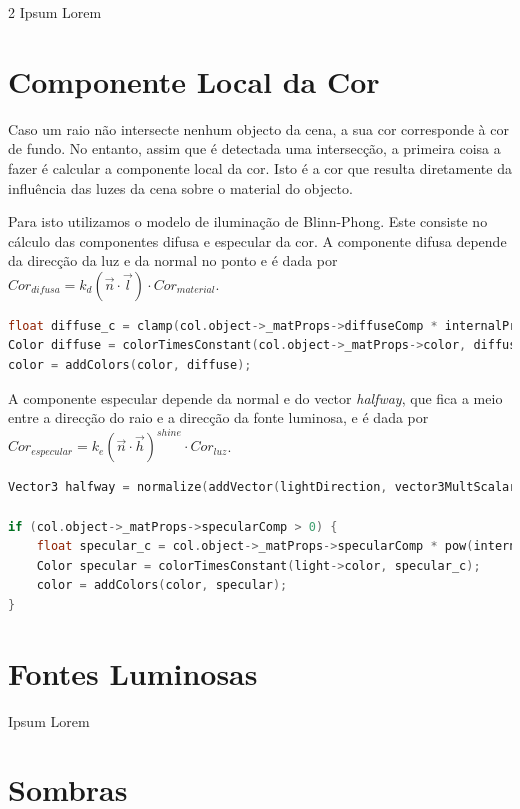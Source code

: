 \documentclass{article}
\begin{document}
\begin{multicols}{2}
    Ipsum Lorem

    \section{Componente Local da Cor}

    Caso um raio não intersecte nenhum objecto da cena, a sua cor corresponde
    à cor de fundo. No entanto, assim que é detectada uma intersecção, a
    primeira coisa a fazer é calcular a componente local da cor. Isto é a cor
    que resulta diretamente da influência das luzes da cena sobre o material
    do objecto.

    Para isto utilizamos o modelo de iluminação de Blinn-Phong. Este consiste no
    cálculo das componentes difusa e especular da cor. A componente difusa depende
    da direcção da luz e da normal no ponto e é dada por
    $ Cor_{difusa} = k_d (\vec{n} \cdot \vec{l}) \cdot Cor_{material} $.

\begin{lstlisting}[language=C++]
float diffuse_c = clamp(col.object->_matProps->diffuseComp * internalProduct(col.normal, lightDirection), 0, 1);
Color diffuse = colorTimesConstant(col.object->_matProps->color, diffuse_c);
color = addColors(color, diffuse);
\end{lstlisting}

    A componente especular depende da normal e do vector \textit{halfway}, que fica a meio
    entre a direcção do raio e a direcção da fonte luminosa, e é dada por
    $ Cor_{especular} = k_e (\vec{n} \cdot \vec{h})^{shine} \cdot Cor_{luz} $.

\begin{lstlisting}[language=C++]
Vector3 halfway = normalize(addVector(lightDirection, vector3MultScalar(ray.versor, -1)));

if (col.object->_matProps->specularComp > 0) {
    float specular_c = col.object->_matProps->specularComp * pow(internalProduct(col.normal, halfway), col.object->_matProps->shine);
    Color specular = colorTimesConstant(light->color, specular_c);
    color = addColors(color, specular);
}
\end{lstlisting}

    \section{Fontes Luminosas}

    Ipsum Lorem

    \section{Sombras}


\end{multicols}
\end{document}
